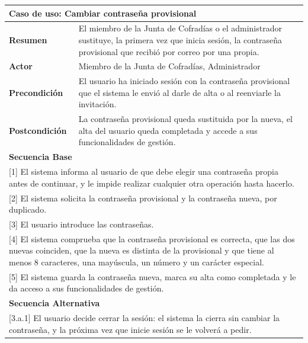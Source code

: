 \begin{table}[h!]
    \centering
    \renewcommand{\arraystretch}{1.5}

    \begin{tabular}{|p{4cm}|p{11cm}|}
        \hline
        \multicolumn{2}{|l|}{\textbf{Caso de uso: Cambiar contraseña provisional}} \\
        \hline
        \textbf{Resumen} & El miembro de la Junta de Cofradías o el administrador sustituye, la primera vez que inicia sesión, la contraseña provisional que recibió por correo por una propia. \\
        \hline
        \textbf{Actor} & Miembro de la Junta de Cofradías, Administrador \\
        \hline
        \textbf{Precondición} & El usuario ha iniciado sesión con la contraseña provisional que el sistema le envió al darle de alta o al reenviarle la invitación. \\
        \hline
        \textbf{Postcondición} & La contraseña provisional queda sustituida por la nueva, el alta del usuario queda completada y accede a sus funcionalidades de gestión. \\
        \hline
        \multicolumn{2}{|l|}{\textbf{Secuencia Base}} \\
        \hline
        \multicolumn{2}{|p{15cm}|}{ [1] El sistema informa al usuario de que debe elegir una contraseña propia antes de continuar, y le impide realizar cualquier otra operación hasta hacerlo. } \\
        \hline
        \multicolumn{2}{|p{15cm}|}{ [2] El sistema solicita la contraseña provisional y la contraseña nueva, por duplicado. } \\
        \hline
        \multicolumn{2}{|p{15cm}|}{ [3] El usuario introduce las contraseñas. } \\
        \hline
        \multicolumn{2}{|p{15cm}|}{ [4] El sistema comprueba que la contraseña provisional es correcta, que las dos nuevas coinciden, que la nueva es distinta de la provisional y que tiene al menos 8 caracteres, una mayúscula, un número y un carácter especial. } \\
        \hline
        \multicolumn{2}{|p{15cm}|}{ [5] El sistema guarda la contraseña nueva, marca su alta como completada y le da acceso a sus funcionalidades de gestión. } \\
        \hline
        \multicolumn{2}{|l|}{\textbf{Secuencia Alternativa}} \\
        \hline
        \multicolumn{2}{|p{15cm}|}{ [3.a.1] El usuario decide cerrar la sesión: el sistema la cierra sin cambiar la contraseña, y la próxima vez que inicie sesión se le volverá a pedir. } \\

\end{tabular}
\end{table}
